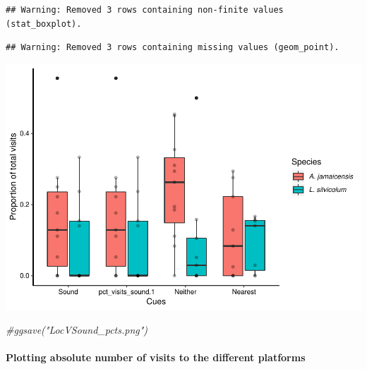 \documentclass[]{article}
\newenvironment{Shaded}{\begin{snugshade}}{\end{snugshade}}
\newcommand{\CommentTok}[1]{\textcolor[rgb]{0.56,0.35,0.01}{\textit{{#1}}}}
\let\oldparagraph\paragraph
\renewcommand{\paragraph}[1]{\oldparagraph{#1}\mbox{}}
\begin{document}
\begin{verbatim}
## Warning: Removed 3 rows containing non-finite values (stat_boxplot).
\end{verbatim}

\begin{verbatim}
## Warning: Removed 3 rows containing missing values (geom_point).
\end{verbatim}

\includegraphics{Sensory_learning_files/figure-latex/unnamed-chunk-21-1.pdf}

\begin{Shaded}
\begin{Highlighting}[]
\CommentTok{#ggsave("LocVSound_pcts.png")}
\end{Highlighting}
\end{Shaded}

\paragraph{Plotting absolute number of visits to the different
platforms}\label{plotting-absolute-number-of-visits-to-the-different-platforms}
\end{document}
